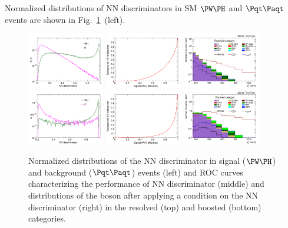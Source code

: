 \documentclass[a4paper,11pt]{article}
\newcommand{\Pt}{{{\Pqt}}\xspace}
\newcommand{\PAt}{{{{\Paqt}}}\xspace}
\begin{document}
Normalized distributions of NN discriminators in SM $\PW\PH$ and $\Pt\PAt$ events are shown in Fig.~\ref{fig:MVA}~(left). 
\begin{figure}[hbtp]
\begin{center}
\includegraphics[width=0.3\textwidth]{Figures/New/RECO/Plot_WH_MVA_WH_fast_resolved.png}
\includegraphics[width=0.3\textwidth]{Figures/New/RECO/ROC_plot_TT_MVA_resolved.png}
\includegraphics[width=0.3\textwidth]{Figures/New/RECO/Plot_Resolved_SR_V_pt_sigpurity.png}
\includegraphics[width=0.3\textwidth]{Figures/New/RECO/Plot_WH_MVA_WH_fast_boosted.png}
\includegraphics[width=0.3\textwidth]{Figures/New/RECO/ROC_plot_TT_MVA_boosted.png}
\includegraphics[width=0.3\textwidth]{Figures/New/RECO/Plot_Boosted_SR_V_pt_sigpurity.png}
\end{center}
\caption{
Normalized distributions of the NN discriminator in signal ($\PW\PH$) and background ($\Pt\PAt$) events (left) and ROC curves characterizing the performance of NN discriminator (middle) and  distributions of the \PW boson \pt after applying a condition on the NN discriminator (right) in the resolved (top) and boosted (bottom) categories.
}
\label{fig:MVA}
\end{figure}
\end{document}
